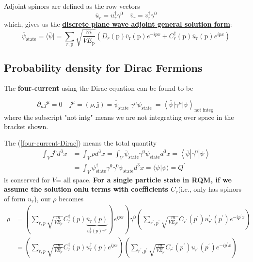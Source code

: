 Adjoint spinors are defined as the row vectors
\begin{equation}
\bar{u}_{r}=u_{r}^{\dagger} \gamma^{0} \quad \bar{v}_{r}=v_{r}^{\dagger} \gamma^{0}
\end{equation}
which, gives us the \textbf{\underline{discrete plane wave adjoint general solution form}}:
\begin{equation}
\bar{\psi}_{\text {state}}=\langle\bar{\psi}|=\sum_{r, \mathrm{p}} \sqrt{\frac{m}{V E_{\mathrm{p}}}}\left(D_{r}(\mathrm{p}) \bar{v}_{\mathrm{r}}(\mathrm{p}) e^{-i p x}+C_{r}^{\dagger}(\mathrm{p}) \bar{u}_{r}(\mathrm{p}) e^{i p x}\right)
\end{equation}
\subsection{Probability density for Dirac Fermions}
The \textbf{four-current} using the Dirac equation can be found to be
\begin{qt}
\begin{equation}
\partial_{\mu} j^{\mu}=0 \quad j^{\mu}=(\rho, \mathbf{j})=\bar{\psi}_{\text {state }} \gamma^{\mu} \psi_{\text {state }}=\left\langle\bar{\psi}\left|\gamma^{\mu}\right| \psi\right\rangle_{\text {not integ }}
\label{four-current-Dirac}
\end{equation}
where the subscript "not intg" means we are not integrating over space in the bracket shown.
\end{qt}
The (\ref{four-current-Dirac}) means the total quantity
\begin{equation}
\begin{aligned}
\int_{V} j^{0} d^{3} x &=\int_{V} \rho d^{3} x=\int_{V} \bar{\psi}_{\text {state}} \gamma^{0} \psi_{\text {state}} d^{3} x=\left\langle\bar{\psi}\left|\gamma^{0}\right| \psi\right\rangle \\
&=\int_{V} \psi_{\text {state}}^{\dagger} \gamma^{0} \gamma^{0} \psi_{\text {state}} d^{3} x=\langle\psi | \psi\rangle= Q^{\prime}
\end{aligned}
\end{equation}
is conserved for $V$= all space. \textbf{For a single particle state in RQM, if we assume the solution onlu terms with coefficients $C_r$}(i.e., only has spinors of form $u_r$), our $\rho$ becomes
\begin{equation}
\begin{aligned}
\rho &\left.=\left(\sum_{r, p} \sqrt{\frac{m}{V E_{p}}} C_{r}^{\dagger}(p) \underbrace{\bar{u}_{r}(p)}_{u_{r}^{\dagger}(p) \gamma^{o}}\right)e^{i p x}\right) \gamma^{0}\left(\sum_{r^{\prime}, p^{\prime}} \sqrt{\frac{m}{V E_{p^{p}}}} C_{r^{\prime}}\left(p^{\prime}\right) u_{r^{\prime}}^{\prime}\left(p^{\prime}\right) e^{-i p^{\prime} x}\right) \\
&=\left(\sum_{r, p} \sqrt{\frac{m}{V E_{p}}} C_{r}^{\dagger}(p) u_{r}^{\dagger}(p) e^{i p x}\right)\left(\sum_{r^{\prime}, p^{\prime}} \sqrt{\frac{m}{V E_{p}}} C_{r^{\prime}}\left(p^{\prime}\right) u_{r^{\prime}}\left(p^{\prime}\right) e^{-i p^{\prime} x}\right)
\end{aligned}
\end{equation}
